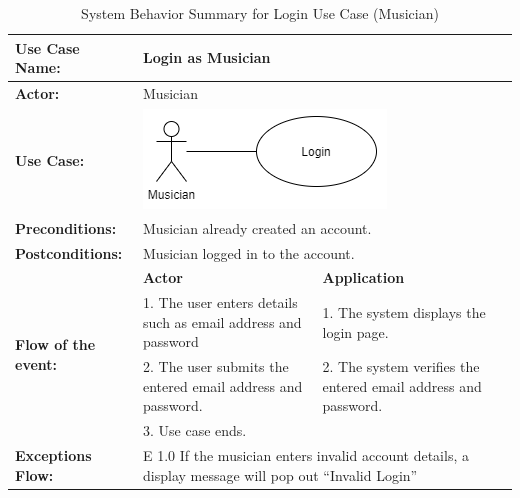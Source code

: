 \begin{longtable}{|p{3cm}|p{5cm}|p{5cm}|}
    \caption{System Behavior Summary for Login Use Case (Musician)} \\
    \hline
    \textbf{Use Case Name:} & \multicolumn{2}{l|}{Login as Musician} \\ \hline
    \textbf{Actor:} & \multicolumn{2}{l|}{Musician} \\ \hline
    \textbf{Use Case:} & \multicolumn{2}{l|}{\includegraphics[width=0.5\linewidth]{mainmatter/images/sucd2.png}} \\ \hline
    \textbf{Preconditions:} & \multicolumn{2}{p{10cm}|}{Musician already created an account.} \\ \hline
    \textbf{Postconditions:} & \multicolumn{2}{p{10cm}|}{Musician logged in to the account.} \\ \hline
    \multirow{4}{3cm}{\raggedright \textbf{Flow of the event:}} & \textbf{Actor} & \textbf{Application} \\ \cline{2-3}
    & 1. The user enters details such as email address and password & 1. The system displays the login page. \\ \cline{2-3}
    & 2. The user submits the entered email address and password. & 2. The system verifies the entered email address and password. \\ \cline{2-3}
    & 3. Use case ends. & \\ \hline
    \multirow{1}{3cm}{\raggedright \textbf{Exceptions Flow:}} 
    & \multicolumn{2}{p{10cm}|}{\raggedright E 1.0 If the musician enters invalid account details, a display message will pop out “Invalid Login”} \\ \hline
\end{longtable}
\pagebreak


